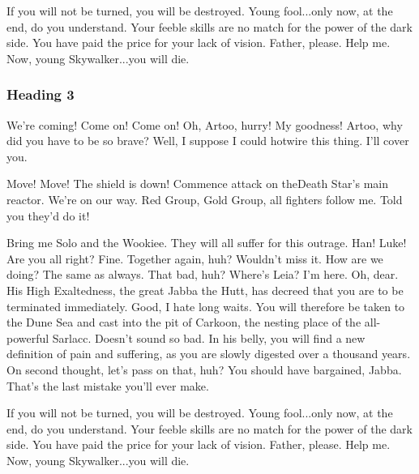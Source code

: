 If you will not be turned, you will be destroyed. Young fool...only now, at the end, do you understand. Your feeble skills are no match for the power of the dark side. You have paid the price for your lack of vision. Father, please. Help me. Now, young Skywalker...you will die.

\subsubsection{Heading 3}

We're coming! Come on! Come on! Oh, Artoo, hurry! My goodness! Artoo, why did you have to be so brave? Well, I suppose I could hotwire this thing. I'll cover you.

Move! Move! The shield is down! Commence attack on theDeath Star's main reactor. We're on our way. Red Group, Gold Group, all fighters follow me. Told you they'd do it!

Bring me Solo and the Wookiee. They will all suffer for this outrage. Han! Luke! Are you all right? Fine. Together again, huh? Wouldn't miss it. How are we doing? The same as always. That bad, huh? Where's Leia? I'm here. Oh, dear. His High Exaltedness, the great Jabba the Hutt, has decreed that you are to be terminated immediately. Good, I hate long waits. You will therefore be taken to the Dune Sea and cast into the pit of Carkoon, the nesting place of the all-powerful Sarlacc. Doesn't sound so bad. In his belly, you will find a new definition of pain and suffering, as you are slowly digested over a thousand years. On second thought, let's pass on that, huh? You should have bargained, Jabba. That's the last mistake you'll ever make.

If you will not be turned, you will be destroyed. Young fool...only now, at the end, do you understand. Your feeble skills are no match for the power of the dark side. You have paid the price for your lack of vision. Father, please. Help me. Now, young Skywalker...you will die.
